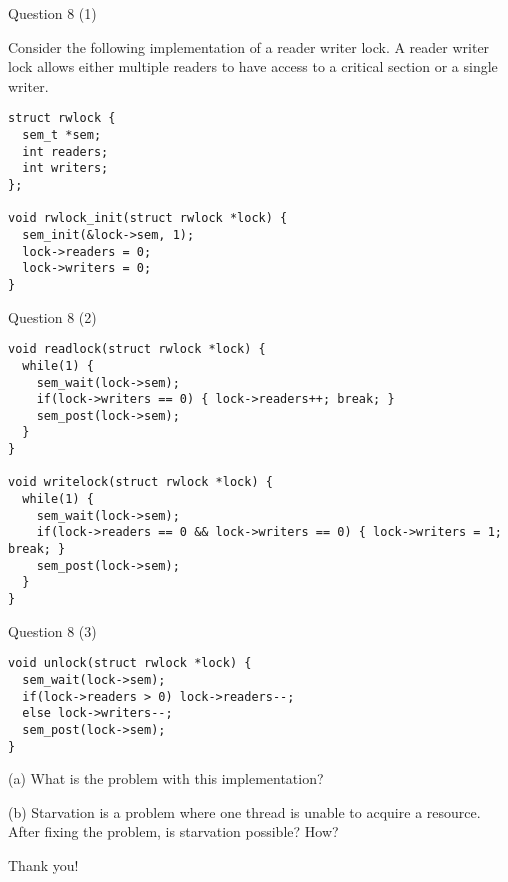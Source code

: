   \begin{frame}[fragile]{Question 8 (1)}

    Consider the following implementation of a reader writer lock. A reader writer lock
allows either multiple readers to have access to a critical section or a single writer.

    \begin{lstlisting}
struct rwlock {
  sem_t *sem;
  int readers;
  int writers;
};

void rwlock_init(struct rwlock *lock) {
  sem_init(&lock->sem, 1);
  lock->readers = 0;
  lock->writers = 0;
}
    \end{lstlisting}
  \end{frame}

  \begin{frame}[fragile]{Question 8 (2)}
    \begin{lstlisting}
void readlock(struct rwlock *lock) {
  while(1) {
    sem_wait(lock->sem);
    if(lock->writers == 0) { lock->readers++; break; }
    sem_post(lock->sem);
  }
}

void writelock(struct rwlock *lock) {
  while(1) {
    sem_wait(lock->sem);
    if(lock->readers == 0 && lock->writers == 0) { lock->writers = 1; break; }
    sem_post(lock->sem);
  }
}
    \end{lstlisting}
  \end{frame}

  \begin{frame}[fragile]{Question 8 (3)}
    \begin{lstlisting}
void unlock(struct rwlock *lock) {
  sem_wait(lock->sem);
  if(lock->readers > 0) lock->readers--;
  else lock->writers--;
  sem_post(lock->sem);
}
    \end{lstlisting}

    \vspace{1em}

    (a) What is the problem with this implementation?

    \vspace{1em}

    (b) Starvation is a problem where one thread is unable to acquire a
resource. After fixing the problem, is starvation possible? How?
  \end{frame}

  \begin{frame}

    \Huge Thank you!
  
  \end{frame}


